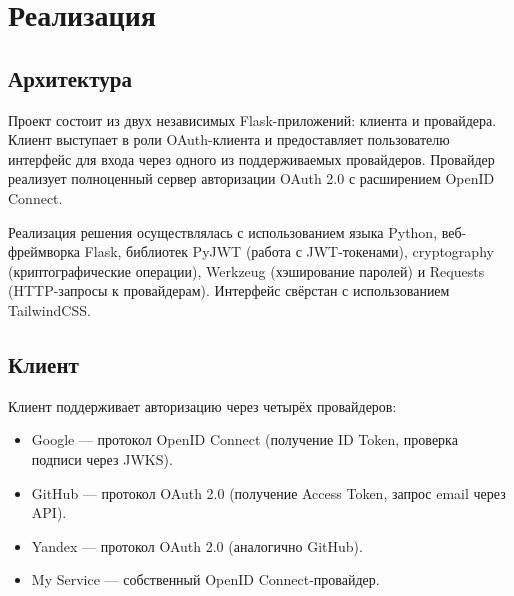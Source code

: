 \documentclass[a4paper]{article}
\begin{document}
\section{Реализация}

\subsection{Архитектура}


Проект состоит из двух независимых Flask-приложений: клиента и провайдера. Клиент выступает в роли OAuth-клиента и предоставляет пользователю интерфейс для входа через одного из поддерживаемых провайдеров. Провайдер реализует полноценный сервер авторизации OAuth 2.0 с расширением OpenID Connect.


Реализация решения осуществлялась с использованием языка Python, веб-фреймворка Flask, библиотек PyJWT (работа с JWT-токенами), cryptography (криптографические операции), Werkzeug (хэширование паролей) и Requests (HTTP-запросы к провайдерам). Интерфейс свёрстан с использованием TailwindCSS.


\subsection{Клиент}

Клиент поддерживает авторизацию через четырёх провайдеров:
\begin{itemize}
    \item Google --- протокол OpenID Connect (получение ID Token, проверка подписи через JWKS).
    \item GitHub --- протокол OAuth 2.0 (получение Access Token, запрос email через API).
    \item Yandex --- протокол OAuth 2.0 (аналогично GitHub).
    \item My Service --- собственный OpenID Connect-провайдер.
\end{itemize}
\end{document}
